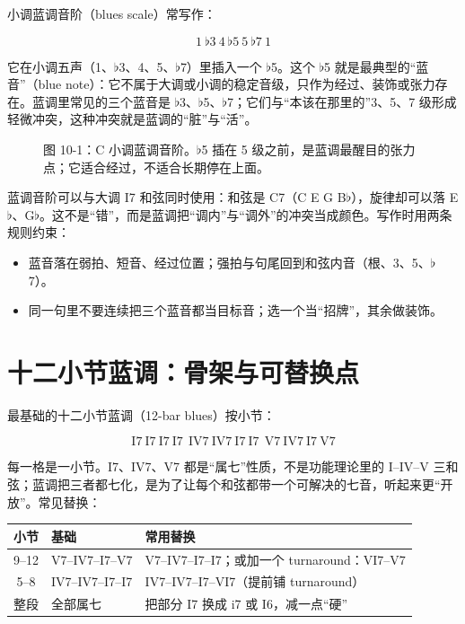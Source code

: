 小调蓝调音阶（blues scale）常写作：

\[
\mathrm{1\ \flat3\ 4\ \flat5\ 5\ \flat7\ 1}
\]

它在小调五声（1、\(\flat\)3、4、5、\(\flat\)7）里插入一个 \(\flat\)5。这个 \(\flat\)5 就是最典型的“蓝音”（blue note）：它不属于大调或小调的稳定音级，只作为经过、装饰或张力存在。蓝调里常见的三个蓝音是 \(\flat\)3、\(\flat\)5、\(\flat\)7；它们与“本该在那里的”3、5、7 级形成轻微冲突，这种冲突就是蓝调的“脏”与“活”。

\begin{figure}[htbp]
\centering
{}
\caption*{图 10-1：C 小调蓝调音阶。\(\flat\)5 插在 5 级之前，是蓝调最醒目的张力点；它适合经过，不适合长期停在上面。}
\end{figure}

蓝调音阶可以与大调 I7 和弦同时使用：和弦是 C7（C E G B\(\flat\)），旋律却可以落 E\(\flat\)、G\(\flat\)。这不是“错”，而是蓝调把“调内”与“调外”的冲突当成颜色。写作时用两条规则约束：

\begin{itemize}
  \item 蓝音落在弱拍、短音、经过位置；强拍与句尾回到和弦内音（根、3、5、\(\flat\)7）。
  \item 同一句里不要连续把三个蓝音都当目标音；选一个当“招牌”，其余做装饰。
\end{itemize}

\section{十二小节蓝调：骨架与可替换点}

最基础的十二小节蓝调（12-bar blues）按小节：

\[
\mathrm{I7\ I7\ I7\ I7\ \ IV7\ IV7\ I7\ I7\ \ V7\ IV7\ I7\ V7}
\]

每一格是一小节。I7、IV7、V7 都是“属七”性质，不是功能理论里的 I--IV--V 三和弦；蓝调把三者都七化，是为了让每个和弦都带一个可解决的七音，听起来更“开放”。常见替换：

\begin{center}
\small
\begin{tabular}{cll}
\toprule
小节 & 基础 & 常用替换 \\
\midrule
9--12 & V7--IV7--I7--V7 & V7--IV7--I7--I7；或加一个 turnaround：VI7--V7 \\
5--8 & IV7--IV7--I7--I7 & IV7--IV7--I7--VI7（提前铺 turnaround） \\
整段 & 全部属七 & 把部分 I7 换成 i7 或 I6，减一点“硬” \\
\bottomrule
\end{tabular}
\end{center}

